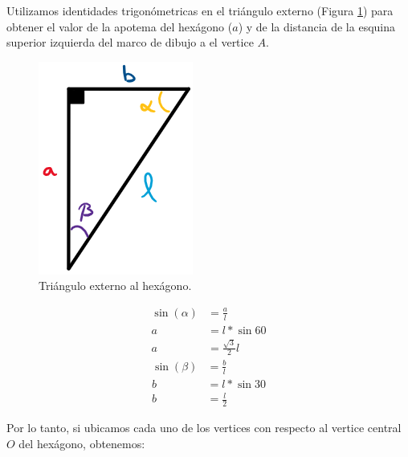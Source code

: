 \documentclass[oneside, a4paper]{article}
\begin{document}
            Utilizamos identidades trigonómetricas en el triángulo externo (Figura \ref{fig:external_triangle_rectangle}) para obtener el valor de la apotema del hexágono ($a$) y de la distancia de la esquina superior izquierda del marco de dibujo a el vertice $A$.

            \begin{figure}[H]
                \centering
                \includegraphics[scale=0.45]{external_triangle_rectangle.png}
                \caption{Triángulo externo al hexágono.}
                \label{fig:external_triangle_rectangle}
            \end{figure}

            \begin{multicols}{2}
                \begin{align}
                    \sin(\alpha) & = \frac{a}{l} \nonumber                          \\
                    a            & = l * \sin{60} \nonumber                         \\
                    a            & = \frac{\sqrt{3}}{2}l \label{eq:apothem_hexagon}
                \end{align}
                \begin{align}
                    \sin(\beta) & = \frac{b}{l} \nonumber                          \\
                    b           & = l * \sin{30} \nonumber                         \\
                    b           & = \frac{l}{2}  \label{eq:base_external_triangle}
                \end{align}
            \end{multicols}

            Por lo tanto, si ubicamos cada uno de los vertices con respecto al vertice central $O$ del hexágono, obtenemos:
\end{document}
